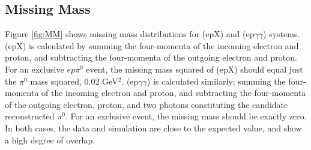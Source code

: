     \clearpage

    \subsection{Missing Mass}
    Figure \ref{fig:MM} shows missing mass distributions for (epX) and (ep$\gamma \gamma$) systems. (epX) is calculated by summing the four-momenta of the incoming electron and proton, and subtracting the four-momenta of the outgoing electron and proton. For an exclusive $ep\pi^0$ event, the missing mass squared of (epX) should equal just the $\pi^0$ mass squared, 0.02 GeV$^2$. (ep$\gamma \gamma$) is calculated similarly; summing the four-momenta of the incoming electron and proton, and subtracting the four-momenta of the outgoing electron, proton, and two photons constituting the candidate reconstructed $\pi^0$. For an exclusive event, the missing mass should be exactly zero. In both cases, the data and simulation are close to the expected value, and show a high degree of overlap.
    

